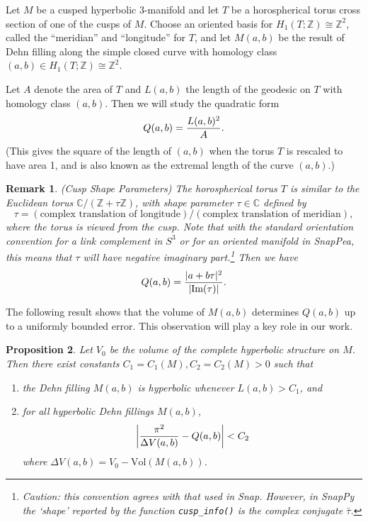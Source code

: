 \documentclass[reqno]{amsproc}  %
\newtheorem{prop}{\bf Proposition}[section]
\newtheorem{rmk}[prop]{\bf Remark}
\def\C{\mathbb{C}}
\def\Z{\mathbb{Z}}
\def\vol{\text{Vol} }
\begin{document}
Let $M$ be a cusped hyperbolic 3-manifold and let $T$ be a horospherical
torus cross section of one of the cusps of $M$.
Choose an oriented basis for $H_1(T;\Z) \cong \Z^2$,  called the ``meridian'' and ``longitude'' for $T$, and 
let $M(a,b)$ be the result of Dehn filling along the 
simple closed curve with homology class $(a,b) \in H_1(T;\Z) \cong \Z^2$.

Let $A$ denote the area of $T$ and $L(a,b)$ the length of the geodesic on $T$ with 
homology class $(a,b)$. Then we will study the quadratic form
\begin{equation}\label{eq1}
Q(a,b) = {L(a,b)^2 \over A}.
\end{equation}
(This gives  the square of the length of  $(a,b)$ when the torus $T$ is rescaled to have area 1,
and is also known as the extremal length of the curve $(a,b)$.)

\begin{rmk}(Cusp Shape Parameters)\label{cusp_param}
{\em 
The horospherical torus $T$ is similar to the Euclidean torus  $\C/(\Z+\tau\Z)$, 
with {\em shape parameter} $\tau \in \C$ defined by
\begin{equation}\label{eq2}
\tau = (\text{complex translation of longitude})/
(\text{complex translation of meridian}),
\end{equation}
where the torus is viewed from the cusp. 
Note that with the standard orientation 
convention  for a link complement in $S^3$ or
for an oriented manifold in SnapPea, this means that $\tau$ will
have {\em negative} imaginary part.\footnote{Caution: this convention
agrees with that used in Snap. However, in SnapPy the `shape' reported 
by the function {\tt cusp\_info()}
is the {\em complex conjugate} $\bar \tau$.}
Then we have
\begin{equation}\label{eq3}
Q(a,b) = {  |a + b \tau|^2 \over | \text{Im}( \tau )| }.
\end{equation} 
}
\end{rmk}

\medskip
The following result shows that the volume of $M(a,b)$ determines 
$Q(a,b)$ up to a uniformly bounded error.
This observation will play a key role in our work.

\begin{prop}\label{error_bound}  Let $V_0$ be the volume of the complete hyperbolic structure on $M$.
Then there exist constants $C_1=C_1(M), C_2 =C_2(M) >0$ 
such that
\begin{enumerate}
\item[(a)] the Dehn filling $M(a,b)$ is hyperbolic whenever  $L(a,b) > C_1$, and
\item[(b)] for all hyperbolic Dehn fillings $M(a,b)$,
\begin{equation}\label{eq4}
\left| {\pi^2  \over \Delta V(a,b)}  - {Q(a,b)} \right| < C_2
\end{equation} 
where $\Delta V(a,b) = V_0 - \vol(M(a,b))$.
\end{enumerate}
\end{prop}
\end{document}
